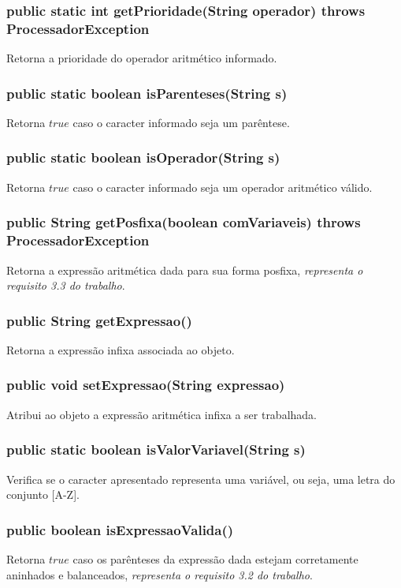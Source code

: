 \documentclass[a4paper,11pt]{article}
\begin{document}
\subsubsection{public static int getPrioridade(String operador) throws ProcessadorException}
Retorna a prioridade do operador aritmético informado.

\subsubsection{public static boolean isParenteses(String s)}
Retorna \(true\) caso o caracter informado seja um parêntese.

\subsubsection{public static boolean isOperador(String s)}
Retorna \(true\) caso o caracter informado seja um operador aritmético válido.

\subsubsection{public String getPosfixa(boolean comVariaveis) throws ProcessadorException}
Retorna a expressão aritmética dada para sua forma posfixa, \emph{representa o requisito 3.3 do trabalho}.

\subsubsection{public String getExpressao()}
Retorna a expressão infixa associada ao objeto.

\subsubsection{public void setExpressao(String expressao) }
Atribui ao objeto a expressão aritmética infixa a ser trabalhada.

\subsubsection{public static boolean isValorVariavel(String s)}
Verifica se o caracter apresentado representa uma variável, ou seja, uma letra do conjunto [A-Z].

\subsubsection{public boolean isExpressaoValida()}
Retorna \(true\) caso os parênteses da expressão dada estejam corretamente aninhados e balanceados, \emph{representa o requisito 3.2 do trabalho}.
\end{document}
